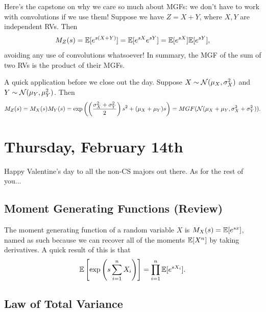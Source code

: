 \documentclass[11 pt]{scrartcl}
\begin{document}
Here's the capstone on why we care so much about MGFs: we don't have to work with convolutions if we use them! Suppose we have $Z = X+Y$, where $X,Y$ are independent RVs. Then 
\[ M_Z(s) = \mathbb E[e^{s(X+Y)}] = \mathbb E[e^{sX}e^{sY}] = \mathbb E[e^{sX}]\mathbb E[e^{sY}],\]
avoiding any use of convolutions whatsoever! In summary, the MGF of the sum of two RVs is the product of their MGFs.

A quick application before we close out the day. Suppose $X\sim\mathcal{N}(\mu_X, \sigma_X^2)$ and $Y\sim\mathcal{N}(\mu_Y, \mu_Y^2)$. Then 
\[ M_Z(s) = M_X(s)M_Y(s) = \exp\left( \left(\dfrac{\sigma_X^2+\sigma_Y^2}{2}\right)s^2 + (\mu_X + \mu_Y)s \right) = MGF(\mathcal{N}(\mu_X+\mu_Y, \sigma_X^2+\sigma_Y^2)).\] 

\newpage
\section{Thursday, February 14th}
Happy Valentine's day to all the non-CS majors out there. As for the rest of you... 

\subsection{Moment Generating Functions (Review)}
The moment generating function of a random variable $X$ is $M_X(s) = \mathbb E[e^{sx}]$, named as such because we can recover all of the moments $\mathbb E[X^n]$ by taking derivatives. A quick result of this is that 
\[ \mathbb E\left[\exp\left(s\sum_{i=1}^n X_i\right)\right] = \prod_{i=1}^n \mathbb E[e^{sX_i}].\]

\subsection{Law of Total Variance}
 
\end{document}

